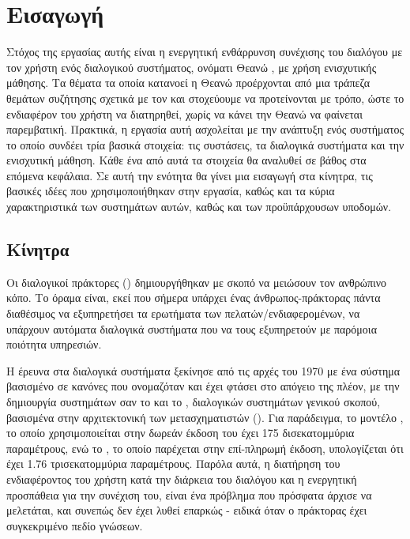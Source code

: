 \chapter{Εισαγωγή}


Στόχος της εργασίας αυτής είναι η ενεργητική ενθάρρυνση συνέχισης του διαλόγου με τον χρήστη ενός διαλογικού συστήματος,
ονόματι Θεανώ \cite{ventoura-etal-2021-theano}, με χρήση ενισχυτικής μάθησης.
Τα θέματα τα οποία κατανοεί η Θεανώ προέρχονται από μια τράπεζα θεμάτων συζήτησης σχετικά με τον 
και στοχεύουμε να προτείνονται με τρόπο, ώστε το ενδιαφέρον του χρήστη να διατηρηθεί, χωρίς να κάνει την Θεανώ να φαίνεται παρεμβατική.
Πρακτικά, η εργασία αυτή ασχολείται με την ανάπτυξη ενός συστήματος το οποίο συνδέει τρία βασικά στοιχεία:
τις συστάσεις, τα διαλογικά συστήματα και την ενισχυτική μάθηση. Κάθε ένα από αυτά τα στοιχεία θα αναλυθεί σε βάθος στα επόμενα κεφάλαια.
Σε αυτή την ενότητα θα γίνει μια εισαγωγή στα κίνητρα, τις βασικές ιδέες που χρησιμοποιήθηκαν στην εργασία,
καθώς και τα κύρια χαρακτηριστικά των συστημάτων αυτών, καθώς και των προϋπάρχουσων υποδομών.


\section{Κίνητρα}

Οι διαλογικοί πράκτορες () δημιουργήθηκαν με σκοπό να μειώσουν τον ανθρώπινο κόπο.
Το όραμα είναι, εκεί που σήμερα υπάρχει ένας άνθρωπος-πράκτορας πάντα διαθέσιμος να εξυπηρετήσει τα ερωτήματα των πελατών/ενδιαφερομένων,
να υπάρχουν αυτόματα διαλογικά συστήματα που να τους εξυπηρετούν με παρόμοια ποιότητα υπηρεσιών.

Η έρευνα στα διαλογικά συστήματα ξεκίνησε από τις αρχές του 1970 με ένα σύστημα βασισμένο σε κανόνες που ονομαζόταν \cite{eliza}
και έχει φτάσει στο απόγειο της πλέον, με την δημιουργία συστημάτων σαν το  και το , διαλογικών συστημάτων γενικού σκοπού,
βασισμένα στην αρχιτεκτονική των μετασχηματιστών ().
Για παράδειγμα, το μοντέλο , το οποίο χρησιμοποιείται στην δωρεάν έκδοση του  έχει 175 δισεκατομμύρια παραμέτρους\cite{brown2020language},
ενώ το , το οποίο παρέχεται στην επί-πληρωμή έκδοση, υπολογίζεται ότι έχει 1.76 τρισεκατομμύρια παραμέτρους. Παρόλα αυτά, η διατήρηση του ενδιαφέροντος
του χρήστη κατά την διάρκεια του διαλόγου και η ενεργητική προσπάθεια για την συνέχιση του, είναι ένα πρόβλημα που πρόσφατα άρχισε να μελετάται, και συνεπώς δεν έχει
λυθεί επαρκώς - ειδικά όταν ο πράκτορας έχει συγκεκριμένο πεδίο γνώσεων.

